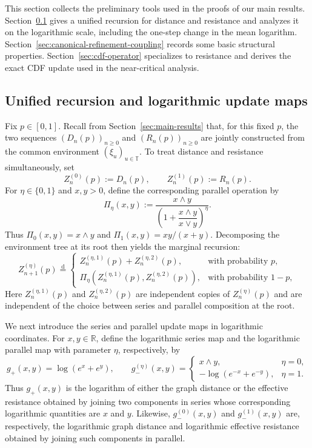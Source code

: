 \documentclass[12pt,preprint]{amsart}
\numberwithin{equation}{section}
\theoremstyle{plain}
\theoremstyle{definition}
\newcommand{\R}{\mathbb R}
\begin{document}
This section collects the preliminary tools used in the proofs of our main
results.  Section~\ref{sec:gate-properties} gives a unified recursion for
distance and resistance and analyzes it on the logarithmic scale, including
the one-step change in the mean logarithm.
Section~\ref{sec:canonical-refinement-coupling} records some basic structural
properties.
Section~\ref{sec:cdf-operator} specializes to resistance and derives the exact
CDF update used in the near-critical analysis.

\subsection{Unified recursion and logarithmic update maps}
\label{sec:gate-properties}

Fix $p\in[0,1]$.
Recall from Section~\ref{sec:main-results} that, for this fixed $p$, the
two sequences $(D_n(p))_{n\ge0}$ and $(R_n(p))_{n\ge0}$ are jointly
constructed from the common environment $(\xi_u)_{u\in\mathbb T}$.
To treat distance and resistance simultaneously, set
\[
 Z_n^{(0)}(p):=D_n(p),
 \qquad
 Z_n^{(1)}(p):=R_n(p).
\]
For $\eta\in\{0,1\}$ and $x,y>0$, define the corresponding
parallel operation by
\begin{equation*}
\Pi_\eta(x,y)
 :=
 \frac{x\wedge y}
 {\left(1+\dfrac{x\wedge y}{x\vee y}\right)^\eta}.
\end{equation*}
Thus $\Pi_0(x,y)=x\wedge y$ and
$\Pi_1(x,y)=xy/(x+y)$.
Decomposing the environment tree at its root then yields the marginal
recursion:
\begin{equation}
 Z_{n+1}^{(\eta)}(p)
 \overset{\mathrm d}{=}
 \begin{cases}
 Z_n^{(\eta,1)}(p)+Z_n^{(\eta,2)}(p),&\text{with probability }p,\\[2mm]
 \Pi_\eta\!\left(Z_n^{(\eta,1)}(p),Z_n^{(\eta,2)}(p)\right),
     &\text{with probability }1-p,
 \end{cases}
 \label{eq:unified-rde}
\end{equation}
Here $Z_n^{(\eta,1)}(p)$ and $Z_n^{(\eta,2)}(p)$ are independent
copies of $Z_n^{(\eta)}(p)$ and are independent of the choice between
series and parallel composition at the root.

We next introduce the series and parallel update maps in logarithmic coordinates.
For $x,y\in\R$, define the
logarithmic series map and the logarithmic parallel map with parameter
$\eta$, respectively, by
\[
 g_+(x,y)=\log(e^x+e^y),
 \qquad
 g_-^{(\eta)}(x,y)=
 \begin{cases}
  x\wedge y,&\eta=0,\\
 -\log(e^{-x}+e^{-y}),&\eta=1.
 \end{cases}
\]
Thus $g_+(x,y)$ is the logarithm of either the graph distance or the effective
resistance obtained by joining two components in series whose corresponding
logarithmic quantities are $x$ and $y$.  Likewise, $g_-^{(0)}(x,y)$ and
$g_-^{(1)}(x,y)$ are, respectively, the logarithmic graph distance and
logarithmic effective resistance obtained by joining such components in
parallel.
\end{document}
